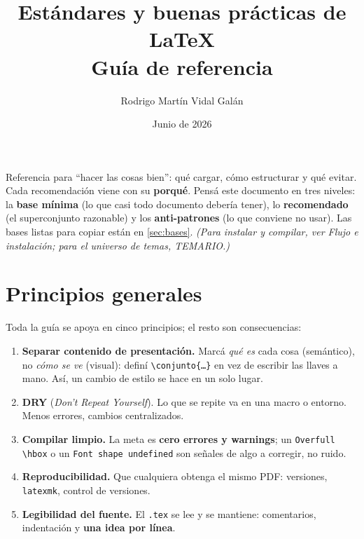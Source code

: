 \documentclass[11pt,a4paper]{article}
\title{\textbf{Estándares y buenas prácticas de \LaTeX}\\[2pt]
       \large Guía de referencia}
\author{Rodrigo Martín Vidal Galán}
\date{Junio de 2026}
\newcommand{\C}[1]{\texttt{\textbackslash #1}}
\begin{document}
\maketitle

\noindent Referencia para \enquote{hacer las cosas bien}: qué cargar, cómo
estructurar y qué evitar. Cada recomendación viene con su \textbf{porqué}. Pensá
este documento en tres niveles: la \textbf{base mínima} (lo que casi todo
documento debería tener), lo \textbf{recomendado} (el superconjunto razonable) y
los \textbf{anti-patrones} (lo que conviene no usar). Las bases listas para
copiar están en \cref{sec:bases}. \emph{(Para instalar y compilar, ver
\emph{Flujo e instalación}; para el universo de temas, \emph{TEMARIO}.)}

\newpage
\tableofcontents
\newpage

\section{Principios generales}
Toda la guía se apoya en cinco principios; el resto son consecuencias:
\begin{enumerate}[noitemsep,leftmargin=*]
  \item \textbf{Separar contenido de presentación.} Marcá \emph{qué es} cada cosa
        (semántico), no \emph{cómo se ve} (visual): definí \C{conjunto\{\dots\}} en
        vez de escribir las llaves a mano. Así, un cambio de estilo se hace en un
        solo lugar.
  \item \textbf{DRY} (\emph{Don't Repeat Yourself}). Lo que se repite va en una
        macro o entorno. Menos errores, cambios centralizados.
  \item \textbf{Compilar limpio.} La meta es \textbf{cero errores y warnings}; un
        \texttt{Overfull \textbackslash hbox} o un \texttt{Font shape undefined}
        son señales de algo a corregir, no ruido.
  \item \textbf{Reproducibilidad.} Que cualquiera obtenga el mismo PDF: versiones,
        \texttt{latexmk}, control de versiones.
  \item \textbf{Legibilidad del fuente.} El \texttt{.tex} se lee y se mantiene:
        comentarios, indentación y \textbf{una idea por línea}.
\end{enumerate}

\end{document}
